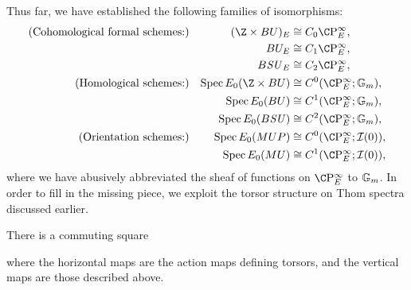 Thus far, we have established the following families of isomorphisms:
\begin{align*}
\text{(Cohomological formal schemes:)} & &
    (\Z \times BU)_E & \cong C_0 \CP^\infty_E, \\
& & BU_E & \cong C_1 \CP^\infty_E, \\
& & B\SU_E & \cong C_2 \CP^\infty_E, \\
\text{(Homological schemes:)} & &
    \Spec E_0(\Z \times BU) & \cong C^0(\CP^\infty_E; \Gm), \\
& & \Spec E_0(BU) & \cong C^1(\CP^\infty_E; \Gm), \\
& & \Spec E_0(B\SU) & \cong C^2(\CP^\infty_E; \Gm), \\
\text{(Orientation schemes:)} & &
    \Spec E_0(MUP) & \cong C^0(\CP^\infty_E; \sheaf I(0)), \\
& & \Spec E_0(MU) & \cong C^1(\CP^\infty_E; \sheaf I(0)),
\end{align*}
where we have abusively abbreviated the sheaf of functions on \(\CP^\infty_E\) to \(\mathbb G_m\).  In order to fill in the missing piece, we exploit the torsor structure on Thom spectra discussed earlier.
\begin{lemma}\label{MSUIsATorsor}
There is a commuting square
\begin{center}
\end{center}
where the horizontal maps are the action maps defining torsors, and the vertical maps are those described above.
\end{lemma}
